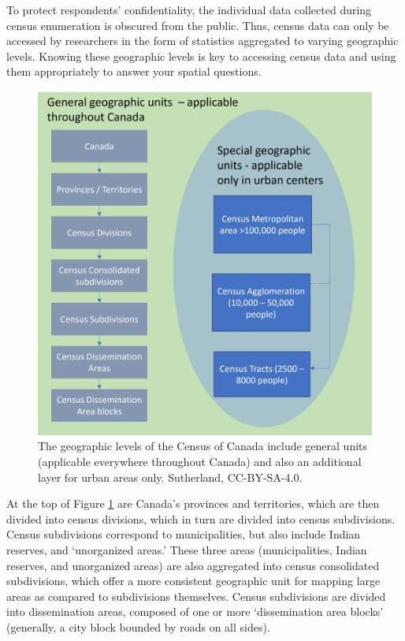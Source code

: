 \documentclass[
]{book}
\begin{document}
To protect respondents' confidentiality, the individual data collected during census enumeration is obscured from the public. Thus, census data can only be accessed by researchers in the form of statistics aggregated to varying geographic levels. Knowing these geographic levels is key to accessing census data and using them appropriately to answer your spatial questions.

\begin{figure}
\includegraphics[width=0.75\linewidth]{images/04-census-geographies} \caption{The geographic levels of the Census of Canada include general units (applicable everywhere throughout Canada) and also an additional layer for urban areas only. Sutherland, CC-BY-SA-4.0.}\label{fig:4-census-geographies}
\end{figure}

At the top of Figure \ref{fig:4-census-geographies} are Canada's provinces and territories, which are then divided into census divisions, which in turn are divided into census subdivisions. Census subdivisions correspond to municipalities, but also include Indian reserves, and `unorganized areas.' These three areas (municipalities, Indian reserves, and unorganized areas) are also aggregated into census consolidated subdivisions, which offer a more consistent geographic unit for mapping large areas as compared to subdivisions themselves. Census subdivisions are divided into dissemination areas, composed of one or more `dissemination area blocks' (generally, a city block bounded by roads on all sides).
\end{document}
